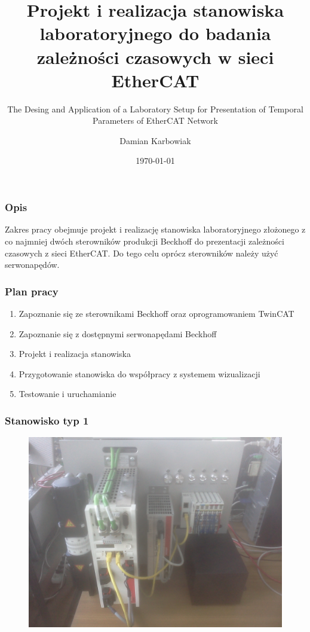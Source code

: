\documentclass[ucs]{beamer}
\title[Zależności czasowe w sieci EtherCAT]{Projekt i realizacja stanowiska laboratoryjnego do badania zależności czasowych w sieci EtherCAT}
\subtitle{The Desing and Application of a Laboratory Setup for Presentation of Temporal Parameters of EtherCAT Network}
\author{Damian Karbowiak}
\institute{Promotor: dr inż. Jacek Stój}
\date{\today}
\begin{document}
\begin{frame}
  \titlepage
\end{frame}

\begin{frame}
\frametitle{Opis}
Zakres pracy obejmuje projekt i realizację stanowiska laboratoryjnego złożonego z co najmniej dwóch sterowników produkcji Beckhoff do prezentacji zależności czasowych z sieci EtherCAT. Do tego celu oprócz sterowników należy użyć serwonapędów.
\end{frame}

\begin{frame}
\frametitle{Plan pracy}
\begin{enumerate}
    \item Zapoznanie się ze sterownikami Beckhoff oraz oprogramowaniem TwinCAT
    \item Zapoznanie się z dostępnymi serwonapędami Beckhoff
    \item Projekt i realizacja stanowiska
    \item Przygotowanie stanowiska do współpracy z systemem wizualizacji
    \item Testowanie i uruchamianie
\end{enumerate}
\end{frame}

\begin{frame}
\frametitle{Stanowisko typ 1}
\begin{figure}[!htb]	
\centering 	          
\includegraphics[height=0.8\textheight]{images/typ1.jpg}
\end{figure}
\end{frame}
\end{document}
